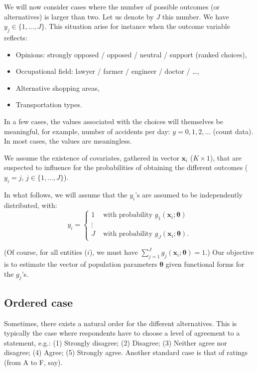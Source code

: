 \documentclass[
  12pt,
]{book}
\providecommand{\tightlist}{%
  \setlength{\itemsep}{0pt}\setlength{\parskip}{0pt}}
\theoremstyle{definition}
\theoremstyle{definition}
\theoremstyle{definition}
\theoremstyle{definition}
\theoremstyle{remark}
\begin{document}
We will now consider cases where the number of possible outcomes (or alternatives) is larger than two. Let us denote by \(J\) this number. We have \(y_j \in \{1,\dots,J\}\). This situation arise for instance when the outcome variable reflects:

\begin{itemize}
\tightlist
\item
  Opinions: strongly opposed / opposed / neutral / support (ranked choices),
\item
  Occupational field: lawyer / farmer / engineer / doctor / \ldots,
\item
  Alternative shopping areas,
\item
  Transportation types.
\end{itemize}

In a few cases, the values associated with the choices will themselves be meaningful, for example, number of accidents per day: \(y = 0, 1,2, \dots\) (count data). In most cases, the values are meaningless.

We assume the existence of covariates, gathered in vector \(\mathbf{x}_i\) (\(K \times 1\)), that are suspected to influence for the probabilities of obtaining the different outcomes (\(y_i=j\), \(j \in \{1,\dots,J\}\)).

In what follows, we will assume that the \(y_i\)'s are assumed to be independently distributed, with:
\begin{equation}
y_i = \left\{
\begin{array}{cl}
1 & \mbox{ with probability } g_1(\mathbf{x}_i;\boldsymbol\theta)\\
\vdots \\
J & \mbox{ with probability } g_J(\mathbf{x}_i;\boldsymbol\theta).
\end{array}
\right.\label{eq:generalMultiNom}
\end{equation}

(Of course, for all entities (\(i\)), we must have \(\sum_{j=1}^J g_j(\mathbf{x}_i;\boldsymbol\theta)=1\).) Our objective is to estimate the vector of population parameters \(\boldsymbol\theta\) given functional forms for the \(g_j\)'s.

\hypertarget{ordered-case}{%
\subsection{Ordered case}\label{ordered-case}}

Sometimes, there exists a natural order for the different alternatives. This is typically the case where respondents have to choose a level of agreement to a statement, e.g.: (1) Strongly disagree; (2) Disagree; (3) Neither agree nor disagree; (4) Agree; (5) Strongly agree. Another standard case is that of ratings (from A to F, say).
\end{document}
